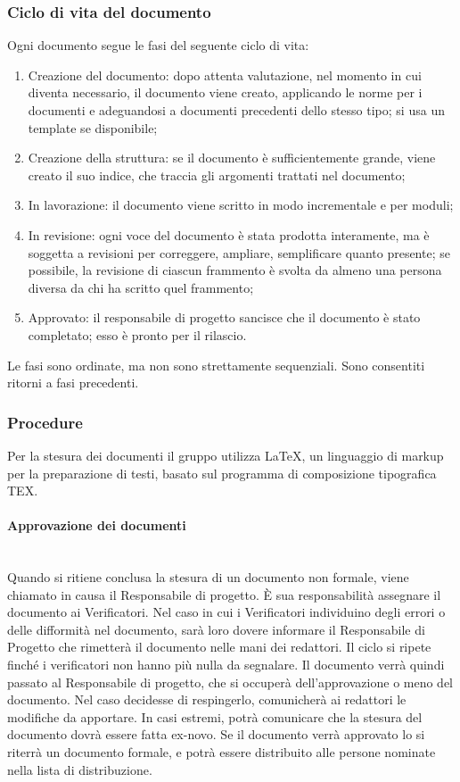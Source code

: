 		\subsubsection{Ciclo di vita del documento}
		Ogni documento segue le fasi del seguente ciclo di vita:
		\begin{enumerate}
			\item Creazione del documento: dopo attenta valutazione, nel momento in cui diventa necessario, il documento viene creato, applicando le norme per i documenti e adeguandosi a documenti precedenti dello stesso tipo; si usa un template se disponibile;
			\item Creazione della struttura: se il documento è sufficientemente grande, viene creato il suo indice, che traccia gli argomenti trattati nel documento;
			\item In lavorazione: il documento viene scritto in modo incrementale e per moduli;
			\item In revisione: ogni voce del documento è stata prodotta interamente, ma è soggetta a revisioni per correggere, ampliare, semplificare quanto presente; se possibile, la revisione di ciascun frammento è svolta da almeno una persona diversa da chi ha scritto quel frammento;
			\item Approvato: il responsabile di progetto sancisce che il documento è stato completato; esso è pronto per il rilascio.
		\end{enumerate}
		Le fasi sono ordinate, ma non sono strettamente sequenziali. Sono consentiti ritorni a fasi precedenti.
		\subsubsection{Procedure}
		Per la stesura dei documenti il gruppo utilizza \LaTeX, un linguaggio di markup per la preparazione di testi, basato sul programma di composizione tipografica TEX.
		\paragraph{Approvazione dei documenti} \mbox{}\\
		Quando si ritiene conclusa la stesura di un documento non formale, viene chiamato in causa il Responsabile di progetto. È sua responsabilità assegnare il documento ai Verificatori. Nel caso in cui i Verificatori individuino degli errori o delle difformità nel documento, sarà loro dovere informare il Responsabile di Progetto che rimetterà il documento nelle mani dei redattori. Il ciclo si ripete finché i verificatori non hanno più nulla da segnalare.
		Il documento verrà quindi passato al Responsabile di progetto, che si occuperà dell’approvazione o meno del documento. Nel caso decidesse di respingerlo, comunicherà ai redattori le modifiche da apportare. In casi estremi, potrà comunicare che la stesura del documento dovrà essere fatta ex-novo. Se il documento verrà approvato lo si riterrà un documento formale, e potrà essere distribuito alle persone nominate nella lista di distribuzione.
